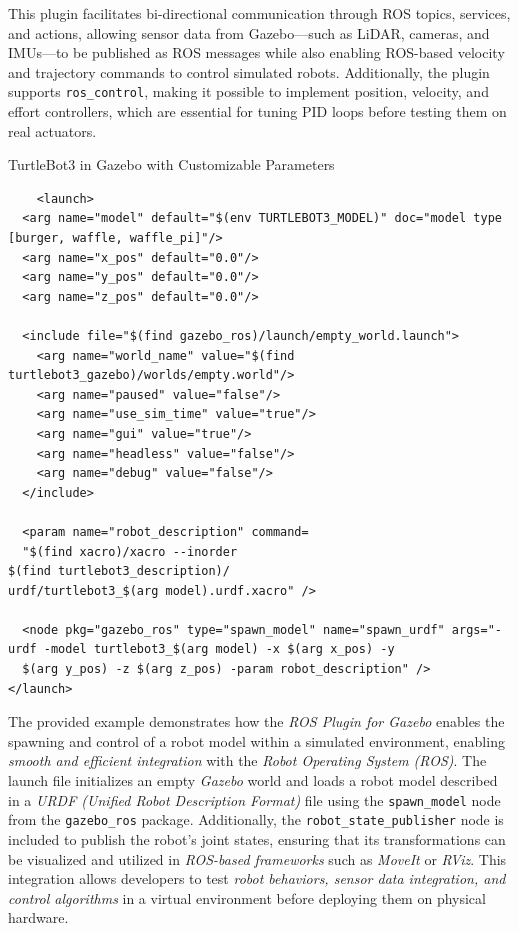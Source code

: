 \documentclass[../../main]{subfiles}
\begin{document}
This plugin facilitates bi-directional communication through ROS topics, services, and actions, allowing sensor data from Gazebo—such as LiDAR, 
cameras, and IMUs—to be published as ROS messages while also enabling ROS-based velocity and trajectory commands to control simulated robots. 
Additionally, the plugin supports \texttt{ros\_control}, making it possible to implement position, velocity, and effort controllers, 
which are essential for tuning PID loops before testing them on real actuators.
\begin{codebox}[]{TurtleBot3 in Gazebo with Customizable Parameters}
\begin{verbatim}
    <launch>
  <arg name="model" default="$(env TURTLEBOT3_MODEL)" doc="model type [burger, waffle, waffle_pi]"/>
  <arg name="x_pos" default="0.0"/>
  <arg name="y_pos" default="0.0"/>
  <arg name="z_pos" default="0.0"/>

  <include file="$(find gazebo_ros)/launch/empty_world.launch">
    <arg name="world_name" value="$(find turtlebot3_gazebo)/worlds/empty.world"/>
    <arg name="paused" value="false"/>
    <arg name="use_sim_time" value="true"/>
    <arg name="gui" value="true"/>
    <arg name="headless" value="false"/>
    <arg name="debug" value="false"/>
  </include>

  <param name="robot_description" command=
  "$(find xacro)/xacro --inorder 
$(find turtlebot3_description)/
urdf/turtlebot3_$(arg model).urdf.xacro" />

  <node pkg="gazebo_ros" type="spawn_model" name="spawn_urdf" args="-urdf -model turtlebot3_$(arg model) -x $(arg x_pos) -y 
  $(arg y_pos) -z $(arg z_pos) -param robot_description" />
</launch>
\end{verbatim}
\end{codebox}
The provided example demonstrates how the \emph{ROS Plugin for Gazebo} enables the spawning and control of a robot model 
within a simulated environment, enabling \emph{smooth and efficient integration} with the \emph{Robot Operating System (ROS)}. 
The launch file initializes an empty \emph{Gazebo} world and loads a robot model described in a 
\emph{URDF (Unified Robot Description Format)} file using the \texttt{spawn\_model} node from the \texttt{gazebo\_ros} package. 
Additionally, the \texttt{robot\_state\_publisher} node is included to publish the robot’s joint states, 
ensuring that its transformations can be visualized and utilized in \emph{ROS-based frameworks} such as \emph{MoveIt} or \emph{RViz}. 
This integration allows developers to test \emph{robot behaviors, sensor data integration, and control algorithms} in a virtual environment 
before deploying them on physical hardware.  
\end{document}
